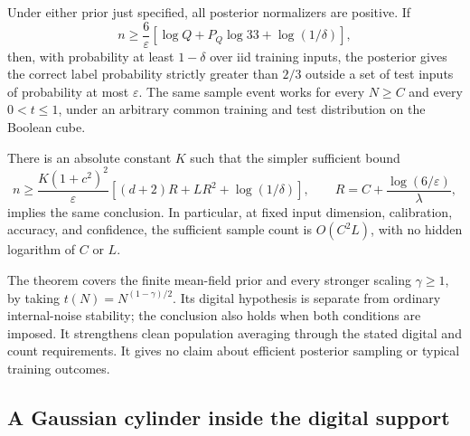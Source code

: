 \begin{theorem}
\label{thm:digital}
Under either prior just specified, all posterior normalizers are positive.
If
\begin{equation}\label{eq:digital-samples}
 n\ge\frac6\varepsilon
       \left[\log Q+P_Q\log33+\log(1/\delta)\right],
\end{equation}
then, with probability at least $1-\delta$ over iid training inputs,
the posterior gives the correct label probability strictly greater than
$2/3$ outside a set of test inputs of probability at most $\varepsilon$.
The same sample event works for every $N\ge C$ and every $0<t\le1$,
under an arbitrary common training and test distribution on the Boolean
cube.

There is an absolute constant $K$ such that the simpler sufficient bound
\begin{equation}\label{eq:digital-envelope}
 n\ge\frac{K(1+c^2)^2}{\varepsilon}
       \left[(d+2)R+LR^2+\log(1/\delta)\right],
 \qquad R=C+\frac{\log(6/\varepsilon)}{\lambda},
\end{equation}
implies the same conclusion.  In particular, at fixed input dimension,
calibration, accuracy, and confidence, the sufficient sample count is
$O(C^2L)$, with no hidden logarithm of $C$ or $L$.
\end{theorem}

The theorem covers the finite mean-field prior and every stronger scaling
$\gamma\ge1$, by taking $t(N)=N^{(1-\gamma)/2}$.  Its digital hypothesis is separate from ordinary internal-noise stability;
the conclusion also holds when both conditions are imposed. It strengthens
clean population averaging through the stated digital and count requirements.  It gives no claim about efficient posterior
sampling or typical training outcomes.

\subsection{A Gaussian cylinder inside the digital support}

